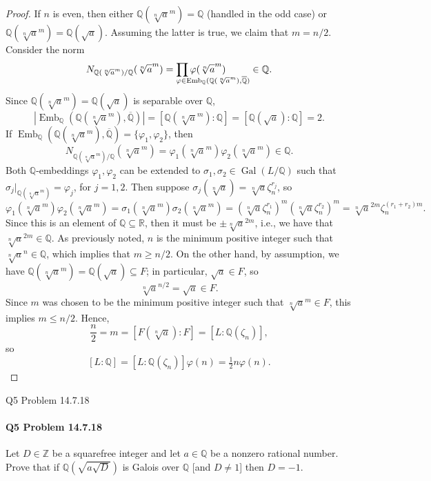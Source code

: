 \documentclass[12pt]{article}
\makeatletter
\newenvironment{fullbox}{\begin{lrbox}{\savefullbox}\begin{minipage}{\dimexpr\textwidth-2\fboxsep\relax}}{\end{minipage}\end{lrbox}\begin{center}\framebox[\textwidth]{\usebox{\savefullbox}}\end{center}}
\newenvironment{pbox}[1][]{\begin{fullbox}\ifx#1\empty\else\paragraph{#1}\fi}{\end{fullbox}}
\newcommand{\Z}{\mathbb{Z}}
\newcommand{\Q}{\mathbb{Q}}
\newcommand{\R}{\mathbb{R}}
\renewcommand{\phi}{\varphi}
\newcommand{\<}{\langle}
\renewcommand{\>}{\rangle}
\newcommand{\clo}{\overline}
\DeclareMathOperator{\Gal}{Gal}
\DeclareMathOperator{\Emb}{Emb}
\newcommand\myprod[2]{
    \begin{array}[t]{@{}l@{}}
        {\displaystyle\prod #2} \\[-3pt] \scriptstyle #1 
    \end{array}
}
\makeatother
\begin{document}
\begin{proof}
    If $n$ is even, then either $\Q(\sqrt[n]{a}^m) = \Q$ (handled in the odd case) or $\Q(\sqrt[n]{a}^m) = \Q(\sqrt{a})$. Assuming the latter is true, we claim that $m = n/2$. Consider the norm
    \[
        N_{\Q(\sqrt[n]{a}^m)/\Q}(\sqrt[n]{a}^m) 
            = \myprod{\phi \in  \Emb_{\Q}(\Q(\sqrt[n]{a}^m), \clo{\Q})}{\phi(\sqrt[n]{a}^m)}
            \in \Q.
    \]
    Since $\Q(\sqrt[n]{a}^m) = \Q(\sqrt{a})$ is separable over $\Q$,
    \[
        |\Emb_{\Q}(\Q(\sqrt[n]{a}^m), \clo{\Q})|
            = [\Q(\sqrt[n]{a}^m) : \Q] 
            = [\Q(\sqrt{a}) : \Q]
            = 2.
    \]
    If $\Emb_{\Q}(\Q(\sqrt[n]{a}^m), \clo{\Q}) = \{\phi_1, \phi_2\}$, then
    \[
        N_{\Q(\sqrt[n]{a}^m)/\Q}(\sqrt[n]{a}^m)
            = \phi_1(\sqrt[n]{a}^m) \phi_2(\sqrt[n]{a}^m) 
            \in \Q.
    \]
    Both $\Q$-embeddings $\phi_1, \phi_2$ can be extended to $\sigma_1, \sigma_2 \in \Gal(L/\Q)$ such that $\sigma_j|_{\Q(\sqrt[n]{a}^m)} = \phi_j$, for $j = 1, 2$. Then suppose $\sigma_j(\sqrt[n]{a}) = \sqrt[n]{a}\zeta_n^{r_j}$, so
    \[
        \phi_1(\sqrt[n]{a}^m) \phi_2(\sqrt[n]{a}^m) 
            = \sigma_1(\sqrt[n]{a}^m) \sigma_2(\sqrt[n]{a}^m)
            = (\sqrt[n]{a}\zeta_n^{r_1})^m (\sqrt[n]{a}\zeta_n^{r_2})^m
            = \sqrt[n]{a}^{2m} \zeta_n^{(r_1 + r_2)m}.
    \]
    Since this is an element of $\Q \subseteq \R$, then it must be $\pm\sqrt[n]{a}^{2m}$, i.e., we have that $\sqrt[n]{a}^{2m} \in \Q$. As previously noted, $n$ is the minimum positive integer such that $\sqrt[n]{a}^n \in \Q$, which implies that $m \geq n/2$. On the other hand, by assumption, we have $\Q(\sqrt[n]{a}^m) = \Q(\sqrt{a}) \subseteq F$; in particular, $\sqrt{a} \in F$, so
    \[
        \sqrt[n]{a}^{n/2} = \sqrt{a} \in F.
    \]
    Since $m$ was chosen to be the minimum positive integer such that $\sqrt[n]{a}^m \in F$, this implies $m \leq n/2$. Hence,
    \[
        \frac{n}{2} 
            = m
            = [F(\sqrt[n]{a}) : F] 
            = [L : \Q(\zeta_n)],
    \]
    so
    \[
        [L : \Q] 
            = [L : \Q(\zeta_n)]\phi(n) 
            = \tfrac{1}{2} n \phi(n).
    \]
    

\end{proof}


\newpage
\begin{pbox}[Q5 Problem 14.7.18]
    Let $D \in \Z$ be a squarefree integer and let $a \in \Q$ be a nonzero rational number. Prove that if $\Q(\sqrt{a\sqrt{D}})$ is Galois over $\Q$ [and $D \ne 1$] then $D = -1$.
\end{pbox}
\end{document}

